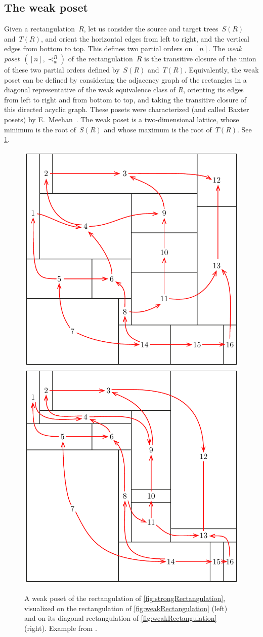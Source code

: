 \documentclass{amsart}
\theoremstyle{definition}
\newcommand{\darkblue}{\color{darkblue}} %
\newcommand{\defn}[1]{\textsl{\darkblue #1}} %
\begin{document}

\subsection{The weak poset}
\label{subsec:weakPoset}

Given a rectangulation~$R$, let us consider the source and target trees~$S(R)$ and~$T(R)$, and orient the horizontal edges from left to right, and the vertical edges from bottom to top.
This defines two partial orders on $[n]$.
The \defn{weak poset}~$([n],\prec_w^R)$ of the rectangulation~$R$ is the transitive closure of the union of these two partial orders defined by~$S(R)$ and~$T(R)$.
Equivalently, the weak poset can be defined by considering the adjacency graph of the rectangles in a diagonal representative of the weak equivalence class of $R$, orienting its edges from left to right and from bottom to top, and taking the transitive closure of this directed acyclic graph.
These posets were characterized (and called Baxter posets) by E.~Meehan~\cite{MR4014603}.
The weak poset is a two-dimensional lattice, whose minimum is the root of~$S(R)$ and whose maximum is the root of~$T(R)$.
See \cref{fig:weakPoset}.

\begin{figure}
	\centerline{\includegraphics[width=.4\textwidth]{weakPoset1} \qquad \includegraphics[width=.4\textwidth]{weakPoset2}}
	\caption{A weak poset of the rectangulation of \cref{fig:strongRectangulation}, visualized on the rectangulation of \cref{fig:weakRectangulation} (left) and on its diagonal rectangulation of \cref{fig:weakRectangulation} (right). Example from \cite{ACFF24}.}
	\label{fig:weakPoset}
\end{figure}
\end{document}
